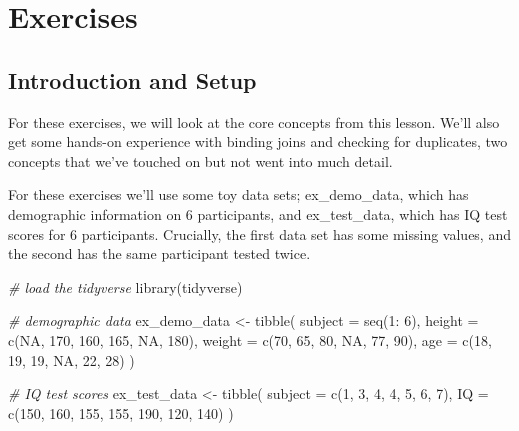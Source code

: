 \documentclass[
]{book}
\newenvironment{Shaded}{\begin{snugshade}}{\end{snugshade}}
\newcommand{\AttributeTok}[1]{\textcolor[rgb]{0.77,0.63,0.00}{#1}}
\newcommand{\CommentTok}[1]{\textcolor[rgb]{0.56,0.35,0.01}{\textit{#1}}}
\newcommand{\ConstantTok}[1]{\textcolor[rgb]{0.00,0.00,0.00}{#1}}
\newcommand{\DecValTok}[1]{\textcolor[rgb]{0.00,0.00,0.81}{#1}}
\newcommand{\FunctionTok}[1]{\textcolor[rgb]{0.00,0.00,0.00}{#1}}
\newcommand{\NormalTok}[1]{#1}
\newcommand{\OtherTok}[1]{\textcolor[rgb]{0.56,0.35,0.01}{#1}}
\newcommand{\SpecialCharTok}[1]{\textcolor[rgb]{0.00,0.00,0.00}{#1}}
\begin{document}
\hypertarget{exercises-3}{%
\section{Exercises}\label{exercises-3}}

\hypertarget{introduction-and-setup}{%
\subsection{Introduction and Setup}\label{introduction-and-setup}}

For these exercises, we will look at the core concepts from this lesson. We'll also get some hands-on experience with binding joins and checking for duplicates, two concepts that we've touched on but not went into much detail.

For these exercises we'll use some toy data sets; ex\_demo\_data, which has demographic information on 6 participants, and ex\_test\_data, which has IQ test scores for 6 participants. Crucially, the first data set has some missing values, and the second has the same participant tested twice.

\begin{Shaded}
\begin{Highlighting}[]
\CommentTok{\# load the tidyverse}
\FunctionTok{library}\NormalTok{(tidyverse)}

\CommentTok{\# demographic data}
\NormalTok{ex\_demo\_data }\OtherTok{\textless{}{-}} \FunctionTok{tibble}\NormalTok{(}
  \AttributeTok{subject =} \FunctionTok{seq}\NormalTok{(}\DecValTok{1}\SpecialCharTok{:} \DecValTok{6}\NormalTok{),}
  \AttributeTok{height =} \FunctionTok{c}\NormalTok{(}\ConstantTok{NA}\NormalTok{, }\DecValTok{170}\NormalTok{, }\DecValTok{160}\NormalTok{, }\DecValTok{165}\NormalTok{, }\ConstantTok{NA}\NormalTok{, }\DecValTok{180}\NormalTok{),}
  \AttributeTok{weight =} \FunctionTok{c}\NormalTok{(}\DecValTok{70}\NormalTok{, }\DecValTok{65}\NormalTok{, }\DecValTok{80}\NormalTok{, }\ConstantTok{NA}\NormalTok{, }\DecValTok{77}\NormalTok{, }\DecValTok{90}\NormalTok{),}
  \AttributeTok{age =} \FunctionTok{c}\NormalTok{(}\DecValTok{18}\NormalTok{, }\DecValTok{19}\NormalTok{, }\DecValTok{19}\NormalTok{, }\ConstantTok{NA}\NormalTok{, }\DecValTok{22}\NormalTok{, }\DecValTok{28}\NormalTok{)}
\NormalTok{  )}

\CommentTok{\# IQ test scores}
\NormalTok{ex\_test\_data }\OtherTok{\textless{}{-}} \FunctionTok{tibble}\NormalTok{(}
  \AttributeTok{subject =} \FunctionTok{c}\NormalTok{(}\DecValTok{1}\NormalTok{, }\DecValTok{3}\NormalTok{, }\DecValTok{4}\NormalTok{, }\DecValTok{4}\NormalTok{, }\DecValTok{5}\NormalTok{, }\DecValTok{6}\NormalTok{, }\DecValTok{7}\NormalTok{),}
  \AttributeTok{IQ =} \FunctionTok{c}\NormalTok{(}\DecValTok{150}\NormalTok{, }\DecValTok{160}\NormalTok{, }\DecValTok{155}\NormalTok{, }\DecValTok{155}\NormalTok{, }\DecValTok{190}\NormalTok{, }\DecValTok{120}\NormalTok{, }\DecValTok{140}\NormalTok{)}
\NormalTok{  )}
\end{Highlighting}
\end{Shaded}
\end{document}
